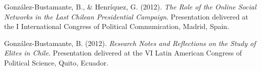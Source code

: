 \begin{publications}
\begin{benumerate}{66}
\item{\small González-Bustamante, B., \& Henríquez, G. (2012). {\itshape The Role of the Online Social Networks in the Last Chilean Presidential Campaign}. Presentation delivered at the I International Congress of Political Communication, Madrid, Spain.}\vspace{1mm}

\item{\small González-Bustamante, B. (2012). {\itshape Research Notes and Reflections on the Study of Elites in Chile}. Presentation delivered at the VI Latin American Congress of Political Science, Quito, Ecuador.}

\end{benumerate}

\end{publications}
